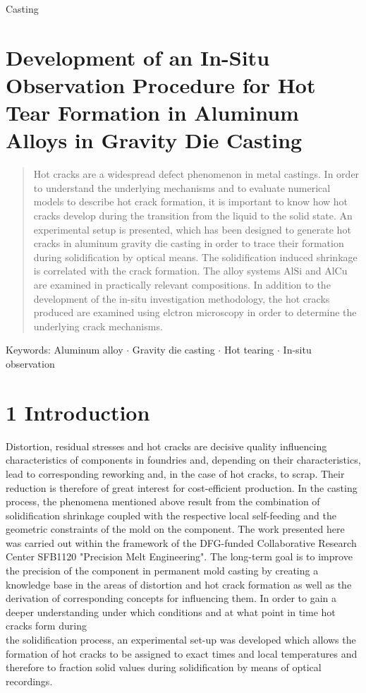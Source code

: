 \documentclass[10pt]{article}
\begin{document}
Casting

\section*{Development of an In-Situ Observation Procedure for Hot Tear Formation in Aluminum Alloys in Gravity Die Casting }


\begin{abstract}
Hot cracks are a widespread defect phenomenon in metal castings. In order to understand the underlying mechanisms and to evaluate numerical models to describe hot crack formation, it is important to know how hot cracks develop during the transition from the liquid to the solid state. An experimental setup is presented, which has been designed to generate hot cracks in aluminum gravity die casting in order to trace their formation during solidification by optical means. The solidification induced shrinkage is correlated with the crack formation. The alloy systems $\mathrm{AlSi}$ and $\mathrm{AlCu}$ are examined in practically relevant compositions. In addition to the development of the in-situ investigation methodology, the hot cracks produced are examined using elctron microscopy in order to determine the underlying crack mechanisms.
\end{abstract}

Keywords: Aluminum alloy $\cdot$ Gravity die casting $\cdot$ Hot tearing $\cdot$ In-situ observation

\section*{1 Introduction}
Distortion, residual stresses and hot cracks are decisive quality influencing characteristics of components in foundries and, depending on their characteristics, lead to corresponding reworking and, in the case of hot cracks, to scrap. Their reduction is therefore of great interest for cost-efficient production. In the casting process, the phenomena mentioned above result from the combination of solidification shrinkage coupled with the respective local self-feeding and the geometric constraints of the mold on the component. The work presented here was carried out within the framework of the DFG-funded Collaborative Research Center SFB1120 "Precision Melt Engineering". The long-term goal is to improve the precision of the component in permanent mold casting by creating a knowledge base in the areas of distortion and hot crack formation as well as the derivation of corresponding concepts for influencing them. In order to gain a deeper understanding under which conditions and at what point in time hot cracks form during\\
the solidification process, an experimental set-up was developed which allows the formation of hot cracks to be assigned to exact times and local temperatures and therefore to fraction solid values during solidification by means of optical recordings.
\end{document}
